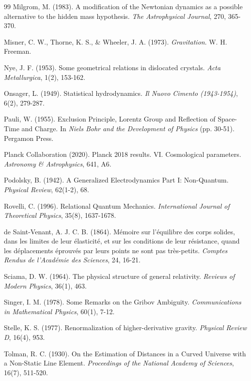 \begin{thebibliography}{99}
Milgrom, M. (1983). A modification of the Newtonian dynamics as a possible alternative to the hidden mass hypothesis. \textit{The Astrophysical Journal}, 270, 365-370.

Misner, C. W., Thorne, K. S., \& Wheeler, J. A. (1973). \textit{Gravitation}. W. H. Freeman.

Nye, J. F. (1953). Some geometrical relations in dislocated crystals. \textit{Acta Metallurgica}, 1(2), 153-162.

Onsager, L. (1949). Statistical hydrodynamics. \textit{Il Nuovo Cimento (1943-1954)}, 6(2), 279-287.

Pauli, W. (1955). Exclusion Principle, Lorentz Group and Reflection of Space-Time and Charge. In \textit{Niels Bohr and the Development of Physics} (pp. 30-51). Pergamon Press.

Planck Collaboration (2020). Planck 2018 results. VI. Cosmological parameters. \textit{Astronomy \& Astrophysics}, 641, A6.

Podolsky, B. (1942). A Generalized Electrodynamics Part I: Non-Quantum. \textit{Physical Review}, 62(1-2), 68.

Rovelli, C. (1996). Relational Quantum Mechanics. \textit{International Journal of Theoretical Physics}, 35(8), 1637-1678.

de Saint-Venant, A. J. C. B. (1864). M\'emoire sur l'\'equilibre des corps solides, dans les limites de leur \'elasticit\'e, et sur les conditions de leur r\'esistance, quand les d\'eplacements \'eprouv\'es par leurs points ne sont pas tr\`es-petits. \textit{Comptes Rendus de l'Acad\'emie des Sciences}, 24, 16-21.

Sciama, D. W. (1964). The physical structure of general relativity. \textit{Reviews of Modern Physics}, 36(1), 463.

Singer, I. M. (1978). Some Remarks on the Gribov Ambiguity. \textit{Communications in Mathematical Physics}, 60(1), 7-12.

Stelle, K. S. (1977). Renormalization of higher-derivative gravity. \textit{Physical Review D}, 16(4), 953.

Tolman, R. C. (1930). On the Estimation of Distances in a Curved Universe with a Non-Static Line Element. \textit{Proceedings of the National Academy of Sciences}, 16(7), 511-520.


\end{thebibliography}
